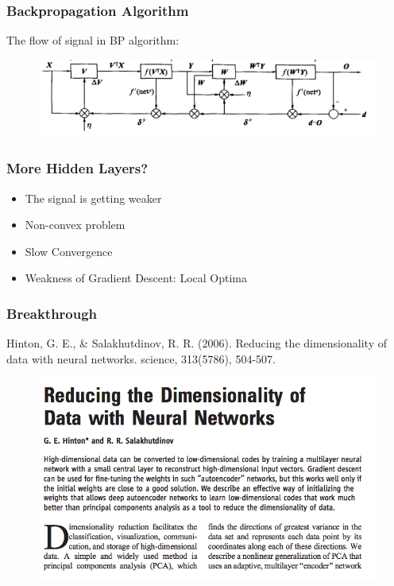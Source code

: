 \documentclass{beamer}
\begin{document}
\begin{frame}
	\frametitle{Backpropagation Algorithm}
	The flow of signal in BP algorithm:
	\begin{figure}
		\includegraphics[width=\linewidth]{bp_flow.png}
	\end{figure}
\end{frame}

\begin{frame}
	\frametitle{More Hidden Layers?}
	\begin{itemize}
		\item The signal is getting weaker
		\item Non-convex problem
		\item Slow Convergence
		\item Weakness of Gradient Descent: Local Optima
	\end{itemize}
\end{frame}

\begin{frame}
	\frametitle{Breakthrough}
	{\small Hinton, G. E., \& Salakhutdinov, R. R. (2006). Reducing the dimensionality of data with neural networks. science, 313(5786), 504-507.}
	\begin{figure}
		\includegraphics[width=0.95\linewidth]{breakthrough}
	\end{figure}
\end{frame}
\end{document}
